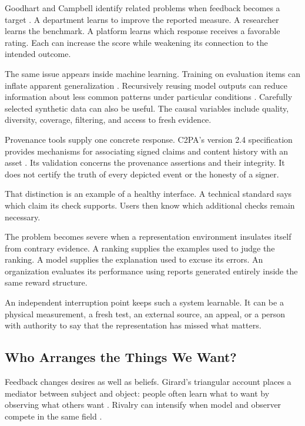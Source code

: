 \documentclass[11pt,openany]{book}
\begin{document}
Goodhart and Campbell identify related problems when feedback becomes a target \cite{goodhart1975problems,campbell1979assessing}. A department learns to improve the reported measure. A researcher learns the benchmark. A platform learns which response receives a favorable rating. Each can increase the score while weakening its connection to the intended outcome.

The same issue appears inside machine learning. Training on evaluation items can inflate apparent generalization \cite{sainz2023nlp}. Recursively reusing model outputs can reduce information about less common patterns under particular conditions \cite{shumailov2024ai}. Carefully selected synthetic data can also be useful. The causal variables include quality, diversity, coverage, filtering, and access to fresh evidence.

Provenance tools supply one concrete response. C2PA's version 2.4 specification provides mechanisms for associating signed claims and content history with an asset \cite{c2pa2026spec}. Its validation concerns the provenance assertions and their integrity. It does not certify the truth of every depicted event or the honesty of a signer.

That distinction is an example of a healthy interface. A technical standard says which claim its check supports. Users then know which additional checks remain necessary.

The problem becomes severe when a representation environment insulates itself from contrary evidence. A ranking supplies the examples used to judge the ranking. A model supplies the explanation used to excuse its errors. An organization evaluates its performance using reports generated entirely inside the same reward structure.

An independent interruption point keeps such a system learnable. It can be a physical measurement, a fresh test, an external source, an appeal, or a person with authority to say that the representation has missed what matters.

\subsection{Who Arranges the Things We Want?}

Feedback changes desires as well as beliefs. Girard's triangular account places a mediator between subject and object: people often learn what to want by observing what others want \cite{girard1961mensonge}. Rivalry can intensify when model and observer compete in the same field \cite{girard1972violence}.
\end{document}

